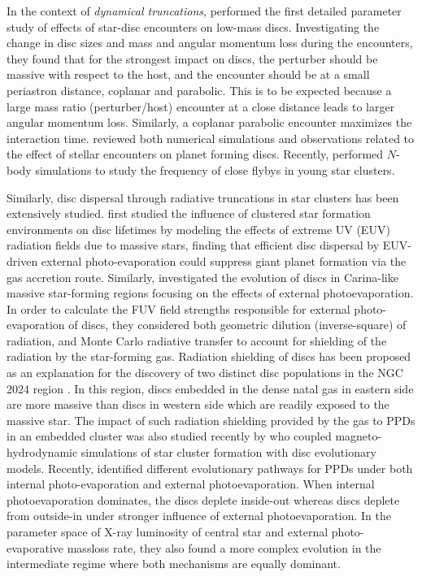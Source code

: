 \documentclass[fleqn,usenatbib]{mnras}
\begin{document}
In the context of \emph{dynamical truncations}, \cite{Pfalzner2005A&A...437..967P} performed the first detailed parameter study of effects of star-disc encounters on low-mass discs. Investigating the change in disc sizes and mass and angular momentum loss during the encounters, they found that for the strongest impact on discs, the perturber should be massive with respect to the host, and the encounter should be at a small periastron distance, coplanar and parabolic. This is to be expected because a large mass ratio (perturber/host) encounter at a close distance leads to larger angular momentum loss. Similarly, a coplanar parabolic encounter maximizes the interaction time. \cite{Cuello2022arXiv220709752C} reviewed both numerical simulations and observations related to the effect of stellar encounters on planet forming discs. Recently, \cite{Pfalzner2021ApJ...921...90P} performed $N$-body simulations to study the frequency of close flybys in young star clusters. 

Similarly, disc dispersal through radiative truncations in star clusters has been extensively studied. \cite{Armitage2000A&A...362..968A} first studied the influence of clustered star formation environments on disc lifetimes by modeling the effects of extreme UV (EUV) radiation fields due to massive stars, finding that efficient disc dispersal by EUV-driven external photo-evaporation could suppress giant planet formation via the gas accretion route. Similarly, \cite{Qiao2022MNRAS.512.3788Q} investigated the evolution of discs in Carina-like massive star-forming regions focusing on the effects of external photoevaporation. In order to calculate the FUV field strengths responsible for external photo-evaporation of discs, they considered both geometric dilution (inverse-square) of radiation, and Monte Carlo radiative transfer to account for shielding of the radiation by the star-forming gas. Radiation shielding of discs has been proposed as an explanation for the discovery of two distinct disc populations in the NGC 2024 region \citep{vanTerwisga2020A&A...640A..27V}. In this region, discs embedded in the dense natal gas in eastern side are more massive than discs in western side which are readily exposed to the massive star. The impact of such radiation shielding provided by the gas to PPDs in an embedded cluster was also studied recently by \cite{Wilhelm2023arXiv230203721W} who coupled magneto-hydrodynamic simulations of star cluster formation with disc evolutionary models. Recently, \cite{Coleman2022MNRAS.514.2315C} identified different evolutionary pathways for PPDs under both internal photo-evaporation and external photoevaporation. When internal photoevaporation dominates, the discs deplete inside-out whereas discs deplete from outside-in under stronger influence of external photoevaporation. In the parameter space of X-ray luminosity of central star and external photo-evaporative massloss rate, they also found a more complex evolution in the intermediate regime where both mechanisms are equally dominant.
\end{document}
